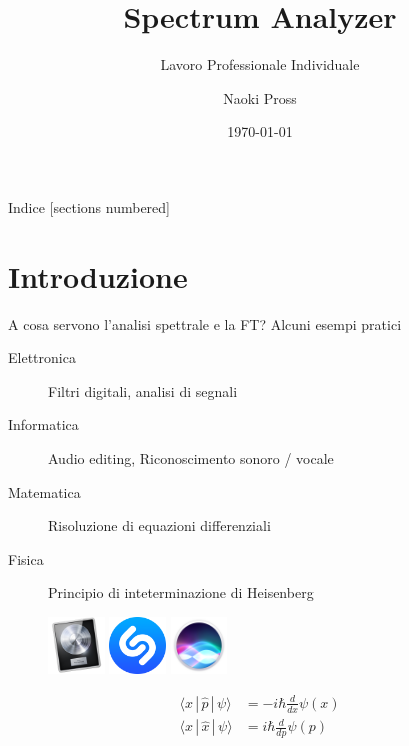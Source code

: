 \documentclass[10pt, xetex, handout]{beamer}
\title{Spectrum Analyzer}
\subtitle{Lavoro Professionale Individuale}
\date{\today}
\author{Naoki Pross}
\institute{SAM Bellinzona}
\begin{document}
\maketitle

\begin{frame}{Indice}
    [sections numbered]
    \tableofcontents[hideallsubsections]
\end{frame}

\section{Introduzione}
\begin{frame}{A cosa servono l'analisi spettrale e la FT?}
    \vfill
    Alcuni esempi pratici
    \begin{description}
        \item [Elettronica] Filtri digitali, analisi di segnali
        \item [Informatica] Audio editing, Riconoscimento sonoro / vocale
        \item [Matematica] Risoluzione di equazioni differenziali
        \item [Fisica] Principio di inteterminazione di Heisenberg
    \end{description}
    \vfill
    \begin{figure} \centering
        \includegraphics[height=1.5cm]{figures/logo/logic}
        \hfill
        \includegraphics[height=1.5cm]{figures/logo/shazam}
        \hfill
        \includegraphics[height=1.5cm]{figures/logo/siri}
        \hfill
        \begin{minipage}[b][1.5cm][c]{.25\linewidth}
        \begin{align*}
            \langle x\,|\,\hat p\,|\,\psi \rangle &= 
                -i\mathbf{\hbar}\frac{d}{dx} \psi(x) \\
            \langle x\,|\,\hat x\,|\,\psi \rangle &= 
                i\mathbf{\hbar}\frac{d}{dp} \psi(p) \\
        \end{align*}
        \end{minipage}
    \end{figure}
\end{frame}
\end{document}
